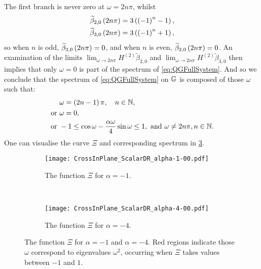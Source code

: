 The first branch is never zero at $\omega=2n\pi$, whilst
\begin{align*}
	\widetilde{\beta}_{2,0}\left( 2n\pi \right) &= 3\left( \left( -1 \right)^n - 1 \right), \\
	\widetilde{\beta}_{3,0}\left( 2n\pi \right) &= 3\left( \left( -1 \right)^n + 1 \right),
\end{align*}
so when $n$ is odd, $\widetilde{\beta}_{3,0}\left( 2n\pi \right) = 0$, and when $n$ is even, $\widetilde{\beta}_{2,0}\left( 2n\pi \right) = 0$.
An examination of the limits $\lim_{\omega\rightarrow2n\pi}H^{(2)}\widetilde{\beta}_{2,0}$ and $\lim_{\omega\rightarrow2n\pi}H^{(2)}\widetilde{\beta}_{3,0}$ then implies that only $\omega=0$ is part of the spectrum of \eqref{eq:QGFullSystem}.
And so we conclude that the spectrum of \eqref{eq:QGFullSystem} on $\mathbb{G}$ is composed of those $\omega$ such that:
\begin{subequations} \label{eq:CrossInPlane_ScalarDR}
	\begin{align}
		&\omega = \left( 2n-1 \right)\pi, \quad n\in\mathbb{N}, \\
		\text{or } &\omega = 0, \\
		\text{or } & -1 \leq \cos\omega - \frac{\alpha\omega}{4}\sin\omega \leq 1, \ \text{and} \ \omega\neq 2n\pi, n\in\mathbb{N}.
	\end{align}
\end{subequations}
One can visualise the curve $\Xi$ and corresponding spectrum in \ref{fig:CrossInPlane_ScalarDR}.
\begin{figure}[b]
	\centering
	\begin{subfigure}[t]{0.45\textwidth}
		\centering
		\texttt{[image: CrossInPlane\_ScalarDR\_alpha-1-00.pdf]}
		\caption{\label{fig:CrossInPlane_ScalarDR_alpha-1-00} The function $\Xi$ for $\alpha=-1$.}
	\end{subfigure}
	~
	\begin{subfigure}[t]{0.45\textwidth}
		\centering
		\texttt{[image: CrossInPlane\_ScalarDR\_alpha-4-00.pdf]}
		\caption{\label{fig:CrossInPlane_ScalarDR_alpha-4-00} The function $\Xi$ for $\alpha=-4$.}
	\end{subfigure}
	\caption{\label{fig:CrossInPlane_ScalarDR} The function $\Xi$ for $\alpha=-1$ and $\alpha=-4$. Red regions indicate those $\omega$ correspond to eigenvalues $\omega^2$, occurring when $\Xi$ takes values between $-1$ and $1$.}
\end{figure}

